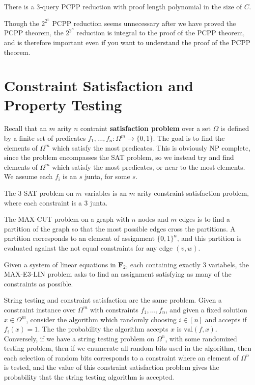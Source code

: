 \begin{theorem}[PCPP]
    There is a 3-query PCPP reduction with proof length polynomial in the size of $C$.
\end{theorem}

Though the $2^{2^n}$ PCPP reduction seems unnecessary after we have proved the PCPP theorem, the $2^{2^n}$ reduction is integral to the proof of the PCPP theorem, and is therefore important even if you want to understand the proof of the PCPP theorem.

\section{Constraint Satisfaction and Property Testing}

Recall that an $m$ arity $n$ contraint {\bf satisfaction problem} over a set $\Omega$ is defined by a finite set of predicates $f_1, \dots, f_n: \Omega^m \to \{ 0, 1 \}$. The goal is to find the elements of $\Omega^m$ which satisfy the most predicates. This is obviously NP complete, since the problem encompasses the SAT problem, so we instead try and find elements of $\Omega^m$ which satisfy the most predicates, or near to the most elements. We assume each $f_i$ is an $s$ junta, for some $s$.

\begin{example}
    The 3-SAT problem on $m$ variables is an $m$ arity constraint satisfaction problem, where each constraint is a 3 junta.
\end{example}

\begin{example}
    The MAX-CUT problem on a graph with $n$ nodes and $m$ edges is to find a partition of the graph so that the most possible edges cross the partitions. A partition corresponds to an element of assignment $\{ 0, 1 \}^n$, and this partition is evaluated against the not equal constraints for any edge $(v,w)$.
\end{example}

\begin{example}
    Given a system of linear equations in $\mathbf{F}_2$, each containing exactly 3 variabels, the MAX-E3-LIN problem asks to find an assignment satisfying as many of the constraints as possible.
\end{example}

String testing and constraint satisfaction are the same problem. Given a constraint instance over $\Omega^m$ with constraints $f_1, \dots, f_n$, and given a fixed solution $x \in \Omega^m$, consider the algorithm which randomly choosing $i \in [n]$ and accepts if $f_i(x) = 1$. The the probability the algorithm accepts $x$ is $\text{val}(f, x)$. Conversely, if we have a string testing problem on $\Omega^n$, with some randomized testing problem, then if we enumerate all random bits used in the algorithm, then each selection of random bits corresponds to a constraint where an element of $\Omega^n$ is tested, and the value of this constraint satisfaction problem gives the probability that the string testing algorithm is accepted.

